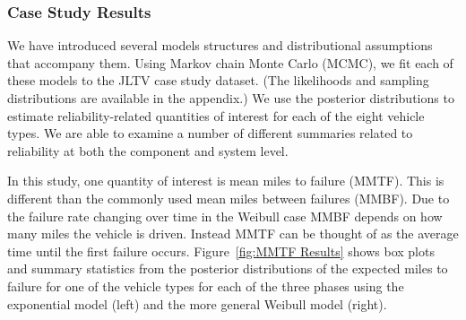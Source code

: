 \documentclass[12pt]{article}
\begin{document}
\subsubsection{Case Study Results}
We have introduced several models structures and distributional assumptions that accompany them.  Using Markov chain Monte Carlo (MCMC), we fit each of these models to the JLTV case study
dataset. (The likelihoods and sampling distributions are available in the appendix.) We use the posterior distributions to estimate reliability-related quantities of interest for each of the eight vehicle types.  We are able to examine a number of different summaries related to reliability at both the component and system level.

In this study, one quantity of interest is mean miles to failure (MMTF). This is different than the commonly used mean miles between failures (MMBF).  Due to the failure rate changing over time in the Weibull case MMBF depends on how many miles the vehicle is driven.  Instead MMTF can be thought of as the average time until the first failure occurs. Figure~\ref{fig:MMTF Results} shows box plots and summary statistics from the posterior distributions of the expected miles to failure for one of the vehicle types for each of the three phases using the exponential model (left) and the more general Weibull model (right).
\end{document}
